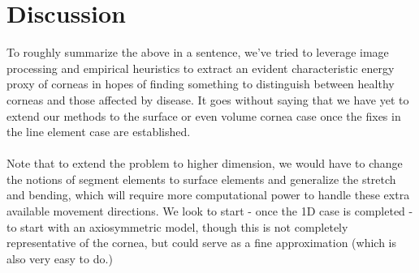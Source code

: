 \documentclass[epjST]{svjour}
\begin{document}
\section{Discussion}
To roughly summarize the above in a sentence, we've tried to leverage image processing and empirical heuristics to extract an evident characteristic energy proxy of corneas in hopes of finding something to distinguish between healthy corneas and those affected by disease. It goes without saying that we have yet to extend our methods to the surface or even volume cornea case once the fixes in the line element case are established.\\\\
Note that to extend the problem to higher dimension, we would have to change the notions of segment elements to surface elements and generalize the stretch and bending, which will require more computational power to handle these extra available movement directions. We look to start - once the 1D case is completed - to start with an axiosymmetric model, though this is not completely representative of the cornea, but could serve as a fine approximation (which is also very easy to do.)
\end{document}
